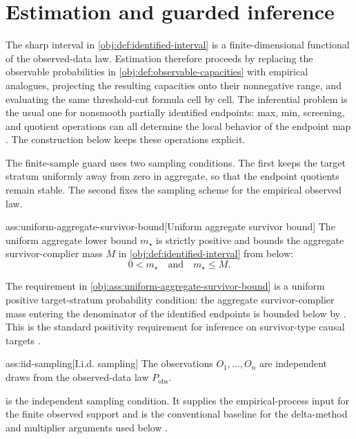 \section{Estimation and guarded inference}\label{sec:inference}

The sharp interval in \cref{obj:def:identified-interval} is a finite-dimensional functional of the observed-data law.  Estimation therefore proceeds by replacing the observable probabilities in \cref{obj:def:observable-capacities} with empirical analogues, projecting the resulting capacities onto their nonnegative range, and evaluating the same threshold-cut formula cell by cell.  The inferential problem is the usual one for nonsmooth partially identified endpoints: max, min, screening, and quotient operations can all determine the local behavior of the endpoint map \citep{ImbensManski2004,ChernozhukovHongTamer2007,Tamer2010,Molinari2020,FangSantos2019}.  The construction below keeps these operations explicit.

The finite-sample guard uses two sampling conditions.  The first keeps the target stratum uniformly away from zero in aggregate, so that the endpoint quotients remain stable.  The second fixes the sampling scheme for the empirical observed law.

\begin{assumptionv}{ass:uniform-aggregate-survivor-bound}[Uniform aggregate survivor bound]
The uniform aggregate lower bound \(m_{\star}\) is strictly positive and bounds the aggregate survivor-complier mass \(M\) in \cref{obj:def:identified-interval} from below:
\[
0<m_{\star}
\quad\text{and}\quad
m_{\star}\le M.
\]
\end{assumptionv}

The requirement in \cref{obj:ass:uniform-aggregate-survivor-bound} is a uniform positive target-stratum probability condition: the aggregate survivor-complier mass entering the denominator of the identified endpoints is bounded below by .  This is the standard positivity requirement for inference on survivor-type causal targets \citep{KennedyHarrisKeele2019}.

\begin{assumptionv}{ass:iid-sampling}[I.i.d. sampling]
The observations \(O_1,\ldots,O_n\) are independent draws from the observed-data law \(P_{\mathrm{obs}}\).
\end{assumptionv}

 is the independent sampling condition.  It supplies the empirical-process input for the finite observed support and is the conventional baseline for the delta-method and multiplier arguments used below \citep{vanDerVaart1998}.


